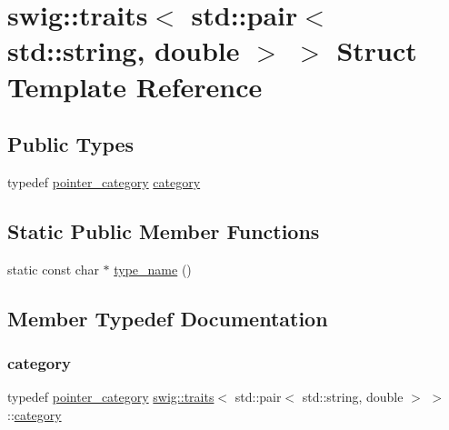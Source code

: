 \hypertarget{structswig_1_1traits_3_01std_1_1pair_3_01std_1_1string_00_01double_01_4_01_4}{}\section{swig\+:\+:traits$<$ std\+:\+:pair$<$ std\+:\+:string, double $>$ $>$ Struct Template Reference}
\label{structswig_1_1traits_3_01std_1_1pair_3_01std_1_1string_00_01double_01_4_01_4}
\subsection*{Public Types}
\begin{DoxyCompactItemize}
\item 
typedef \hyperlink{structswig_1_1pointer__category}{pointer\+\_\+category} \hyperlink{structswig_1_1traits_3_01std_1_1pair_3_01std_1_1string_00_01double_01_4_01_4_a99cea60adc0369f164c051c99748b385}{category}
\end{DoxyCompactItemize}
\subsection*{Static Public Member Functions}
\begin{DoxyCompactItemize}
\item 
static const char $\ast$ \hyperlink{structswig_1_1traits_3_01std_1_1pair_3_01std_1_1string_00_01double_01_4_01_4_a677c97378120d1b3fc44aaffe50fd712}{type\+\_\+name} ()
\end{DoxyCompactItemize}


\subsection{Member Typedef Documentation}
\mbox{\label{structswig_1_1traits_3_01std_1_1pair_3_01std_1_1string_00_01double_01_4_01_4_a99cea60adc0369f164c051c99748b385}} 
\subsubsection{\texorpdfstring{category}{category}}
{\footnotesize\ttfamily typedef \hyperlink{structswig_1_1pointer__category}{pointer\+\_\+category} \hyperlink{structswig_1_1traits}{swig\+::traits}$<$ std\+::pair$<$ std\+::string, double $>$ $>$\+::\hyperlink{structswig_1_1traits_3_01std_1_1pair_3_01std_1_1string_00_01double_01_4_01_4_a99cea60adc0369f164c051c99748b385}{category}}



